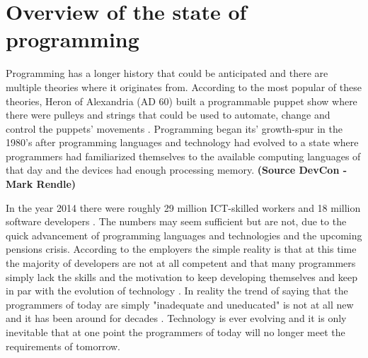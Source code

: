 \documentclass[11pt,a4paper,oneside,article]{memoir}
\begin{document}



\section{Overview of the state of programming}


Programming has a longer history that could be anticipated and there are multiple theories where it originates from. According to the most popular of these theories, Heron of Alexandria (AD 60) built a programmable puppet show where there were pulleys and strings that could be used to automate, change and control the puppets' movements \cite{Randell:1994}. Programming began its' growth-spur in the 1980's after programming languages and technology had evolved to a state where programmers had familiarized themselves to the available computing languages of that day and the devices had enough processing memory. \textbf{(Source DevCon - Mark Rendle)}

In the year 2014 there were roughly 29 million ICT-skilled workers and 18 million software developers \cite{idc:numberof}. The numbers may seem sufficient but are not, due to the quick advancement of programming languages and technologies and the upcoming pensions crisis. According to the employers the simple reality is that at this time the majority of developers are not at all competent and that many programmers simply lack the skills and the motivation to keep developing themselves and keep in par with the evolution of technology \cite[p.~10]{mcculler:book}. In reality the trend of saying that the programmers of today are simply "inadequate and uneducated" is not at all new and it has been around for decades \cite{rouzer:article}. Technology is ever evolving and it is only inevitable that at one point the programmers of today will no longer meet the requirements of tomorrow.
\end{document}
